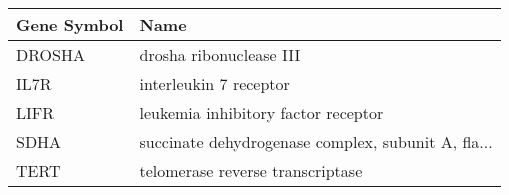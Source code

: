 \begin{tabular}{ll}
\toprule
Gene Symbol &                                               Name \\
\midrule
     DROSHA &                            drosha ribonuclease III \\
       IL7R &                             interleukin 7 receptor \\
       LIFR &                leukemia inhibitory factor receptor \\
       SDHA & succinate dehydrogenase complex, subunit A, fla... \\
       TERT &                   telomerase reverse transcriptase \\
\bottomrule
\end{tabular}

